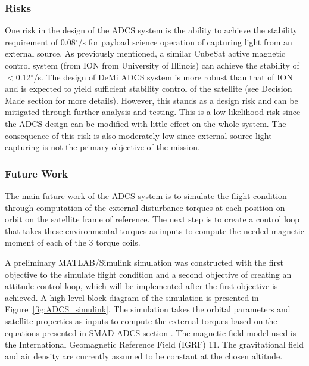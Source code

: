 \documentclass[12pt]{article}
\begin{document}
			\subsubsection{Risks}
			One risk in the design of the ADCS system is the ability to achieve the stability requirement of 0.08$^\circ$/s for payload science operation of capturing light from an external source. As previously mentioned, a similar CubeSat active magnetic control system (from ION from University of Illinois) can achieve the stability of $<$0.12$^\circ$/s. The design of DeMi ADCS system is more robust than that of ION and is expected to yield sufficient stability control of the satellite (see Decision Made section for more details). However, this stands as a design risk and can be mitigated through further analysis and testing. This is a low likelihood risk since the ADCS design can be modified with little effect on the whole system. The consequence of this risk is also moderately low since external source light capturing is not the primary objective of the mission. 
			\subsubsection{Future Work}
			The main future work of the ADCS system is to simulate the flight condition through computation of the external disturbance torques at each position on orbit on the satellite frame of reference. The next step is to create a control loop that takes these environmental torques as inputs to compute the needed magnetic moment of each of the 3 torque coils. 

			A preliminary MATLAB/Simulink simulation was constructed with the first objective to the simulate flight condition and a second objective of creating an attitude control loop, which will be implemented after the first objective is achieved. A high level block diagram of the simulation is presented in Figure~\ref{fig:ADCS_simulink}. The simulation takes the orbital parameters and satellite properties as inputs to compute the external torques based on the equations presented in SMAD ADCS section \cite[p.~570-573]{SMAD}. The magnetic field model used is the International Geomagnetic Reference Field (IGRF) 11. The gravitational field and air density are currently assumed to be constant at the chosen altitude. 
\end{document}
